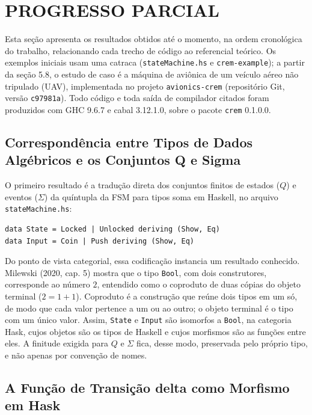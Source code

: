 \documentclass[12pt,a4paper]{article}
\begin{document}
\section{PROGRESSO PARCIAL}

Esta seção apresenta os resultados obtidos até o momento, na ordem cronológica do trabalho, relacionando cada trecho de código ao referencial teórico. Os exemplos iniciais usam uma catraca (\texttt{stateMachine.hs} e \texttt{crem-example}); a partir da seção 5.8, o estudo de caso é a máquina de aviônica de um veículo aéreo não tripulado (UAV), implementada no projeto \texttt{avionics-crem} (repositório Git, versão \texttt{c97981a}). Todo código e toda saída de compilador citados foram produzidos com GHC 9.6.7 e cabal 3.12.1.0, sobre o pacote \texttt{crem} 0.1.0.0.

\subsection{Correspondência entre Tipos de Dados Algébricos e os Conjuntos Q e Sigma}

O primeiro resultado é a tradução direta dos conjuntos finitos de estados ($Q$) e eventos ($\Sigma$) da quíntupla da FSM para tipos soma em Haskell, no arquivo \texttt{stateMachine.hs}:

\begin{verbatim}
data State = Locked | Unlocked deriving (Show, Eq)
data Input = Coin | Push deriving (Show, Eq)
\end{verbatim}

Do ponto de vista categorial, essa codificação instancia um resultado conhecido. Milewski (2020, cap. 5) mostra que o tipo \texttt{Bool}, com dois construtores, corresponde ao número $2$, entendido como o coproduto de duas cópias do objeto terminal ($2 = 1 + 1$). Coproduto é a construção que reúne dois tipos em um só, de modo que cada valor pertence a um ou ao outro; o objeto terminal é o tipo com um único valor. Assim, \texttt{State} e \texttt{Input} são isomorfos a \texttt{Bool}, na categoria Hask, cujos objetos são os tipos de Haskell e cujos morfismos são as funções entre eles. A finitude exigida para $Q$ e $\Sigma$ fica, desse modo, preservada pelo próprio tipo, e não apenas por convenção de nomes.

\subsection{A Função de Transição delta como Morfismo em Hask}
\end{document}
